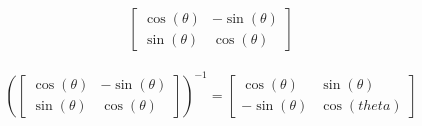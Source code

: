 \begin{align*}
    \begin{bmatrix}
        \cos(\theta) & -\sin(\theta) \\
        \sin(\theta) & \cos(\theta)
    \end{bmatrix}
\end{align*}

\begin{solution}
    \begin{align*}
        \left(\begin{bmatrix}
            \cos(\theta) & -\sin(\theta) \\
            \sin(\theta) & \cos(\theta)
        \end{bmatrix}\right)^{-1}
        = \begin{bmatrix}
            \cos(\theta) & \sin(\theta) \\
            -\sin(\theta) &  \cos(theta)
        \end{bmatrix}
    \end{align*}
\end{solution}